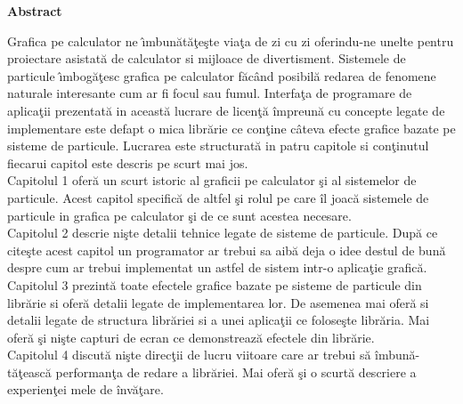 \thispagestyle{plain}

\begin{center}
	\textbf{Abstract}
\end{center}

Grafica pe calculator ne \^ \i mbun\u{a}t\u{a}\c{t}e\c{s}te via\c{t}a de zi cu zi oferindu-ne unelte pentru proiectare asistată de calculator si mijloace de divertisment. Sistemele de particule \^ \i mbog\u{a}\c{t}esc grafica pe calculator f\u{a}c\^{a}nd posibil\u{a} redarea de fenomene naturale interesante cum ar fi focul sau fumul. Interfa\c{t}a de programare de aplica\c{t}ii prezentat\u{a} in aceast\u{a} lucrare de licen\c{t}\u{a} \^{i}mpreun\u{a} cu concepte legate de implementare este defapt o mica libr\u{a}rie ce con\c{t}ine c\^{a}teva efecte grafice bazate pe sisteme de particule. Lucrarea este structurat\u{a} in patru capitole si con\c{t}inutul fiecarui capitol este descris pe scurt mai jos.\\

Capitolul 1 ofer\u{a} un scurt istoric al graficii pe calculator \c{s}i al sistemelor de particule. Acest capitol specific\u{a} de altfel \c{s}i rolul pe care \^{i}l joac\u{a} sistemele de particule in grafica pe calculator \c{s}i de ce sunt acestea necesare.\\

Capitolul 2 descrie ni\c{s}te detalii tehnice legate de sisteme de particule. Dup\u{a} ce cite\c{s}te acest capitol un programator ar trebui sa aib\u{a} deja o idee destul de bun\u{a} despre cum ar trebui implementat un astfel de sistem intr-o aplica\c{t}ie grafic\u{a}.\\

Capitolul 3 prezint\u{a} toate efectele grafice bazate pe sisteme de particule din libr\u{a}rie si ofer\u{a} detalii legate de implementarea lor. De asemenea mai ofer\u{a} si detalii legate de structura libr\u{a}riei si a unei aplica\c{t}ii ce folose\c{s}te libr\u{a}ria. Mai ofer\u{a} \c{s}i ni\c{s}te capturi de ecran ce demonstreaz\u{a} efectele din libr\u{a}rie.\\

Capitolul 4 discut\u{a} ni\c{s}te direc\c{t}ii de lucru viitoare care ar trebui s\u{a} \^{i}mbun\u{a}-t\u{a}\c{t}easc\u{a} performan\c{t}a de redare a libr\u{a}riei. Mai ofer\u{a} \c{s}i o scurt\u{a} descriere a experien\c{t}ei mele de \^{i}nv\u{a}\c{t}are.
